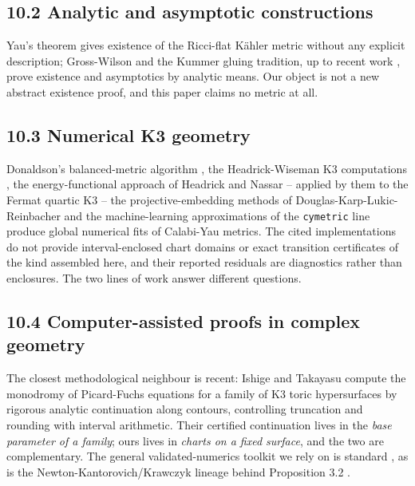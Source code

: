 \subsection{10.2 Analytic and asymptotic constructions}\label{analytic-and-asymptotic-constructions}

Yau's theorem \cite{3} gives existence of the Ricci-flat Kähler metric without any explicit description; Gross-Wilson \cite{4} and the Kummer gluing tradition, up to recent work \cite{5}, prove existence and asymptotics by analytic means. Our object is not a new abstract existence proof, and this paper claims no metric at all.

\subsection{10.3 Numerical K3 geometry}\label{numerical-k3-geometry}

Donaldson's balanced-metric algorithm \cite{6}, the Headrick-Wiseman K3 computations \cite{7}, the energy-functional approach of Headrick and Nassar \cite{8} -- applied by them to the Fermat quartic K3 -- the projective-embedding methods of Douglas-Karp-Lukic-Reinbacher \cite{9} and the machine-learning approximations of the \texttt{cymetric} line \cite{10} produce global numerical fits of Calabi-Yau metrics. The cited implementations do not provide interval-enclosed chart domains or exact transition certificates of the kind assembled here, and their reported residuals are diagnostics rather than enclosures. The two lines of work answer different questions.

\subsection{10.4 Computer-assisted proofs in complex geometry}\label{computer-assisted-proofs-in-complex-geometry}

The closest methodological neighbour is recent: Ishige and Takayasu \cite{11} compute the monodromy of Picard-Fuchs equations for a family of K3 toric hypersurfaces by rigorous analytic continuation along contours, controlling truncation and rounding with interval arithmetic. Their certified continuation lives in the \emph{base parameter of a family}; ours lives in \emph{charts on a fixed surface}, and the two are complementary. The general validated-numerics toolkit we rely on is standard \cite{12,13,14,15}, as is the Newton-Kantorovich/Krawczyk lineage behind Proposition 3.2 \cite{16,17}.

